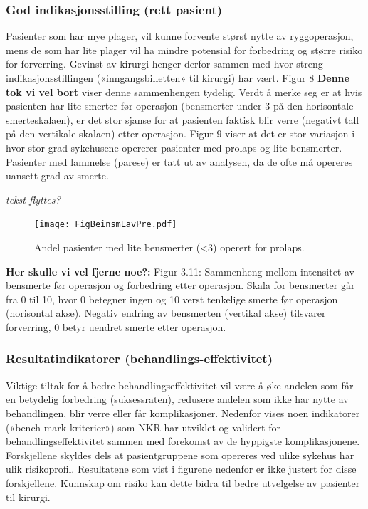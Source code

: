 \documentclass [norsk,a4paper,twoside]{article}\usepackage[]{graphicx}\usepackage[]{color}
\begin{document}
\subsubsection{God indikasjonsstilling (rett pasient)}



Pasienter som har mye plager, vil kunne forvente størst nytte av ryggoperasjon,
mens de som har lite plager vil ha mindre potensial for forbedring og større risiko
for forverring. Gevinst av kirurgi henger derfor sammen med hvor streng
indikasjonsstillingen («inngangsbilletten» til kirurgi) har vært. Figur 8 \textbf{Denne tok vi vel bort} viser denne
sammenhengen tydelig. Verdt å merke seg er at hvis pasienten har lite smerter før
operasjon (bensmerter under 3 på den horisontale smerteskalaen), er det stor
sjanse for at pasienten faktisk blir verre (negativt tall på den vertikale skalaen) etter
operasjon. Figur 9 viser at det er stor variasjon i hvor stor grad sykehusene opererer
pasienter med prolaps og lite bensmerter. Pasienter med lammelse (parese) er tatt
ut av analysen, da de ofte må opereres uansett grad av smerte.

\textit{tekst flyttes?}

\begin{figure}[ht]
\centering \texttt{[image: FigBeinsmLavPre.pdf]}
\caption{\label{fig:BeinsmLavPre}  Andel pasienter med lite bensmerter (<3) operert for prolaps.}
\end{figure}

\textbf{Her skulle vi vel fjerne noe?:}
Figur 3.11: Sammenheng mellom intensitet av bensmerte før operasjon og
forbedring etter operasjon. Skala for bensmerter går fra 0 til 10, hvor 0 betegner
ingen og 10 verst tenkelige smerte før operasjon (horisontal akse). Negativ endring
av bensmerten (vertikal akse) tilsvarer forverring, 0 betyr uendret smerte etter
operasjon.





\subsubsection{Resultatindikatorer (behandlings-effektivitet)}
Viktige tiltak for å bedre behandlingseffektivitet vil være å øke andelen som får en
betydelig forbedring (suksessraten), redusere andelen som ikke har nytte av
behandlingen, blir verre eller får komplikasjoner. Nedenfor vises noen indikatorer
(«bench-mark kriterier») som NKR har utviklet og validert for
behandlingseffektivitet sammen med forekomst av de hyppigste komplikasjonene.
Forskjellene skyldes dels at pasientgruppene som opereres ved ulike sykehus har
ulik risikoprofil. Resultatene som vist i figurene nedenfor er ikke justert for disse
forskjellene. Kunnskap om risiko kan dette bidra til bedre utvelgelse av pasienter til
kirurgi.
\end{document}
